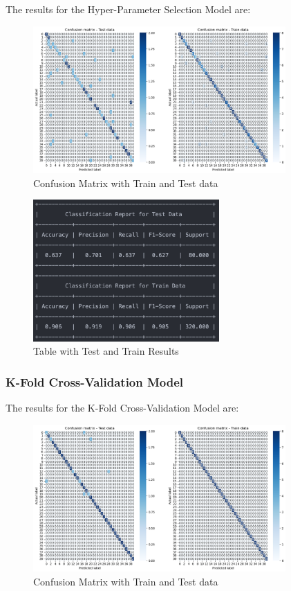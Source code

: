 \documentclass[conference]{IEEEtran}
\begin{document}
The results for the Hyper-Parameter Selection Model are:

\begin{figure}[!h!]
    \includegraphics[width=3.8in]{DT/2.png}%
    \caption{Confusion Matrix with Train and Test data}%
    \label{fig:conf_gnb_2}%
\end{figure}

\begin{figure}[!h!]
    \includegraphics[width=2.8in]{DT/Screenshot 2023-01-21 at 01.15.37.png}%
    \caption{Table with Test and Train Results}%
    \label{fig:conf_gnb_r_2}%
\end{figure}

\subsubsection{K-Fold Cross-Validation Model}

The results for the K-Fold Cross-Validation Model are:

\begin{figure}[!h!]
    \includegraphics[width=3.8in]{DT/3.png}%
    \caption{Confusion Matrix with Train and Test data}%
    \label{fig:conf_gnb_3}%
\end{figure}
\end{document}
